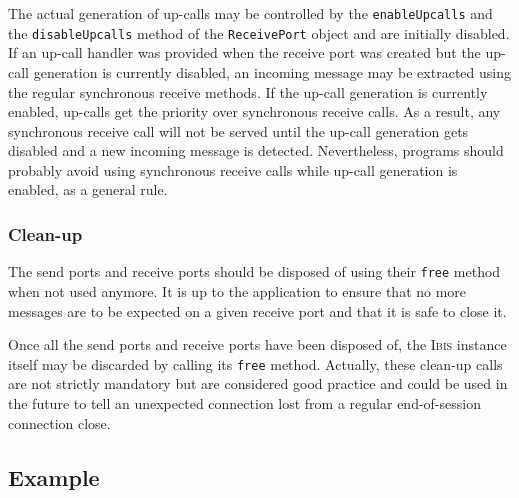 \documentclass[11pt]{book}
\def\Ibis{\textsc{Ibis}\xspace}
\begin{document}
The actual generation of up-calls may be controlled by the
\texttt{enableUpcalls} and the \texttt{disableUpcalls} method of the
\texttt{ReceivePort} object and are initially disabled. If an up-call
handler was provided when the receive port was created but the up-call
generation is currently disabled, an incoming message may be extracted
using the regular synchronous receive methods. If the up-call
generation is currently enabled, up-calls get the priority over
synchronous receive calls. As a result, any synchronous receive call
will not be served until the up-call generation gets disabled and a new
incoming message is detected. Nevertheless, programs should probably
avoid using synchronous receive calls while up-call generation is
enabled, as a general rule.

%
\subsubsection{Clean-up}
\label{sec:clean-up-2}

The send ports and receive ports should be disposed of using their
\texttt{free} method when not used anymore. It is up to the
application to ensure that no more messages are to be expected on a
given receive port and that it is safe to close it.

Once all the send ports and receive ports have been disposed of, the
\Ibis instance itself may be discarded by calling its \texttt{free}
method. Actually, these clean-up calls are not strictly mandatory but
are considered good practice and could be used in the future to tell
an unexpected connection lost from a regular end-of-session connection
close.


\subsection{Example}
\label{sec:example}
\end{document}

